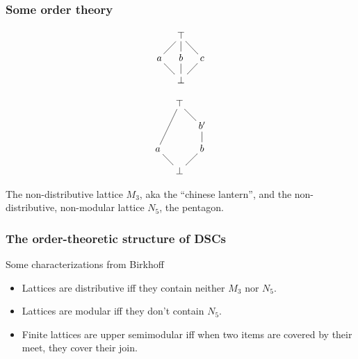 \documentclass{beamer}
\begin{document}
\begin{frame}
\frametitle{Some order theory}
\begin{figure}
\begin{minipage}[c]{0.3\textwidth}
\begin{equation*}
    \xymatrix@=1em{& \top \ar@{-}[dl] \ar@{-}[d] \ar@{-}[dr] & \\
      a \ar@{-}[dr] & b \ar@{-}[d] & c \ar@{-}[dl]  \\
       & \bot &}
\end{equation*}
\end{minipage}
\begin{minipage}[c]{0.3\textwidth}
\begin{equation*}
    \xymatrix@=1em{& \top \ar@{-}[ddl] \ar@{-}[dr] & \\
      & & b'  \ar@{-}[d]  \\
      a \ar@{-}[dr] & & b \ar@{-}[dl] \\
      & \bot &}
\end{equation*}
\end{minipage}
\end{figure}

The non-distributive lattice \(M_3\), aka the ``chinese lantern'', and the non-distributive, non-modular lattice \(N_5\), the pentagon.


\end{frame}

\begin{frame}
\frametitle{The order-theoretic structure of DSCs}
Some characterizations from Birkhoff
\begin{itemize}
\item Lattices are distributive iff they contain neither \(M_3\) nor \(N_5\).
\item Lattices are modular iff they don't contain \(N_5\).
\item Finite lattices are upper semimodular iff when two items are covered by their meet, they cover their join.
\end{itemize}
\end{frame}
\end{document}
